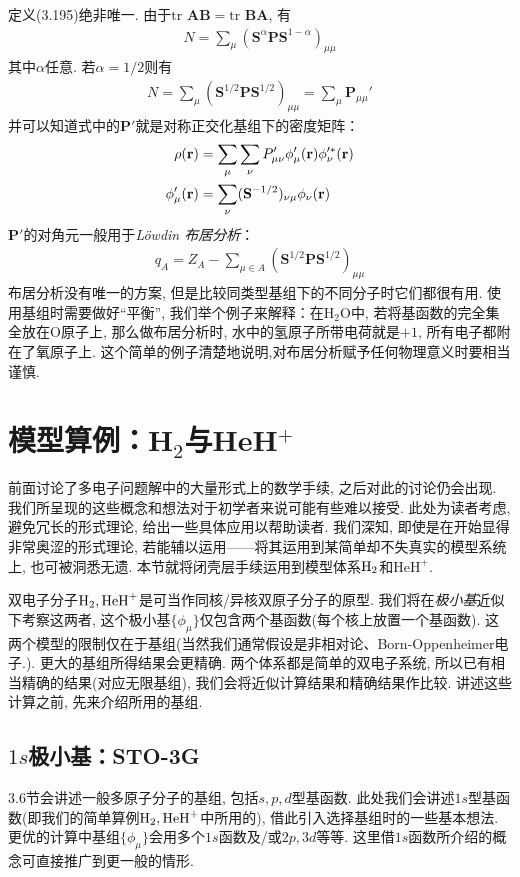 定义(3.195)绝非唯一. 由于$\mathrm{tr}\,\,\mathbf{AB}=\mathrm{tr}\,\,\mathbf{BA}$, 有
\begin{align}
N = \sum_\mu (\mathbf{S}^\alpha\mathbf{PS}^{1-\alpha})_{\mu\mu}
\end{align}
其中$\alpha$任意. 若$\alpha=1/2$则有
\begin{align}
\label{3.198}
N = \sum_\mu (\mathbf{S}^{1/2}\mathbf{PS}^{1/2})_{\mu\mu} = \sum_\mu \mathbf{P}_{\mu\mu}'
\end{align}
并可以知道式中的$\mathbf{P}'$就是对称正交化基组下的密度矩阵：
\begin{align}
\rho(\mathbf{r}) &= \sum_\mu\sum_\nu P'_{\mu\nu}\phi_\mu'(\mathbf{r})\phi_\nu^{\prime *}(\mathbf{r})\\
\phi'_{\mu}(\mathbf{r}) &= \sum_\nu(\mathbf{S}^{-1/2})_{\nu\mu}\phi_\nu(\mathbf{r})
\end{align}
$\mathbf{P}'$的对角元一般用于\emph{L\"owdin 布居分析}：
\begin{align}
q_A = Z_A - \sum_{\mu\in A}(\mathbf{S}^{1/2}\mathbf{PS}^{1/2})_{\mu\mu}
\end{align}
布居分析没有唯一的方案, 但是比较同类型基组下的不同分子时它们都很有用. 使用基组时需要做好``平衡'', 我们举个例子来解释：在$\mathrm{H}_2\mathrm{O}$中, 若将基函数的完全集全放在$\mathrm{O}$原子上, 那么做布居分析时, 水中的氢原子所带电荷就是$+1$, 所有电子都附在了氧原子上. 这个简单的例子清楚地说明,对布居分析赋予任何物理意义时要相当谨慎.
\section{模型算例：H$_2$与HeH$^+$}
前面讨论了多电子问题解中的大量形式上的数学手续, 之后对此的讨论仍会出现. 我们所呈现的这些概念和想法对于初学者来说可能有些难以接受. 此处为读者考虑, 避免冗长的形式理论, 给出一些具体应用以帮助读者. 我们深知, 即使是在开始显得非常奥涩的形式理论, 若能辅以运用——将其运用到某简单却不失真实的模型系统上, 也可被洞悉无遗. 本节就将闭壳层\hft 手续运用到模型体系$\mathrm{H}_2$和$\mathrm{HeH}^+$.

双电子分子$\mathrm{H}_2,\mathrm{HeH}^+$是可当作同核/异核双原子分子的原型. 我们将在\emph{极小基}近似下考察这两者, 这个极小基$\{\phi_\mu\}$仅包含两个基函数(每个核上放置一个基函数). 这两个模型的限制仅在于基组(当然我们通常假设是非相对论、Born-Oppenheimer电子\ha.). 更大的基组所得结果会更精确. 两个体系都是简单的双电子系统, 所以已有相当精确的结果(对应无限基组), 我们会将近似计算结果和精确结果作比较. 讲述这些计算之前, 先来介绍所用的基组.
\subsection{$1s$极小基：STO-3G}
\label{sec3.5.1}
3.6节会讲述一般多原子分子的基组, 包括$s,p,d$型基函数. 此处我们会讲述$1s$型基函数(即我们的简单算例$\mathrm{H}_2,\mathrm{HeH}^+$中所用的), 借此引入选择基组时的一些基本想法. 更优的计算中基组$\{\phi_\mu\}$会用多个$1s$函数及/或$2p,3d$等等. 这里借$1s$函数所介绍的概念可直接推广到更一般的情形.

